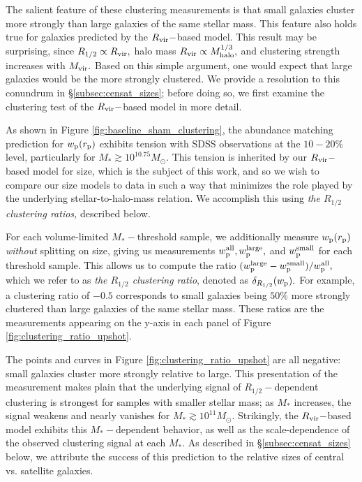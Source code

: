 \documentclass[usenatbib,usegraphicx,letterpaper]{mn2e}
\newcommand{\rhalf}{R_{1/2}}
\newcommand{\mstar}{M_{\ast}}
\newcommand{\mvir}{M_{\rm vir}}
\newcommand{\mhalo}{M_{\rm halo}}
\newcommand{\rvir}{R_{\rm vir}}
\newcommand{\rproj}{r_{\rm p}}
\newcommand{\wproj}{w_{\rm p}}
\newcommand{\wplarge}{w_{\rm p}^{\rm large}}
\newcommand{\wpsmall}{w_{\rm p}^{\rm small}}
\newcommand{\wpall}{w_{\rm p}^{\rm all}}
\newcommand{\msun}{M_\odot}
\begin{document}
The salient feature of these clustering measurements is that small galaxies cluster more strongly than large galaxies of the same stellar mass. This feature also holds true for galaxies predicted by the $\rvir-$based model. This result may be surprising, since $\rhalf\propto\rvir,$ halo mass $\rvir\propto\mhalo^{1/3},$ and clustering strength increases with $\mvir.$ Based on this simple argument, one would expect that large galaxies would be the more strongly clustered. We provide a resolution to this conundrum in \S\ref{subsec:censat_sizes}; before doing so, we first examine the clustering test of the $\rvir-$based model in more detail.

As shown in Figure \ref{fig:baseline_sham_clustering}, the abundance matching prediction for $\wproj(\rproj)$ exhibits tension with SDSS observations at the $10-20\%$ level, particularly for $\mstar\gtrsim10^{10.75}\msun.$ This tension is inherited by our $\rvir-$based model for size, which is the subject of this work, and so we wish to compare our size models to data in such a way that minimizes the role played by the underlying stellar-to-halo-mass relation. We accomplish this using {\em the $\rhalf$ clustering ratios,} described below.

For each volume-limited $\mstar-$threshold sample, we additionally measure $\wproj(\rproj)$ {\em without} splitting on size, giving us measurements $\wpall, \wplarge,$ and $\wpsmall$ for each threshold sample. This allows us to compute the ratio $(\wplarge-\wpsmall)/\wpall,$ which we refer to as {\em the $\rhalf$ clustering ratio}, denoted as $\delta_{\rhalf}(\wproj).$ For example, a clustering ratio of $-0.5$ corresponds to small galaxies being $50\%$ more strongly clustered than large galaxies of the same stellar mass. These ratios are the measurements appearing on the y-axis in each panel of Figure \ref{fig:clustering_ratio_upshot}.

The points and curves in Figure \ref{fig:clustering_ratio_upshot} are all negative: small galaxies cluster more strongly relative to large. This presentation of the measurement makes plain that the underlying signal of $\rhalf-$dependent clustering is strongest for samples with smaller stellar mass; as $\mstar$ increases, the signal weakens and nearly vanishes for $\mstar\gtrsim10^{11}\msun.$ Strikingly, the $\rvir-$based model exhibits this $\mstar-$dependent behavior, as well as the scale-dependence of the observed clustering signal at each $\mstar.$ As described in \S\ref{subsec:censat_sizes} below, we attribute the success of this prediction to the relative sizes of central vs. satellite galaxies.
\end{document}
